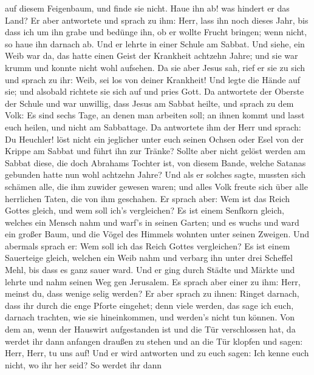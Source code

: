 auf diesem Feigenbaum, und finde sie nicht. Haue ihn ab! was hindert er
das Land?  Er aber antwortete und sprach zu ihm: Herr, lass
ihn noch dieses Jahr, bis dass ich um ihn grabe und bedünge ihn,
 ob er wollte Frucht bringen; wenn nicht, so haue ihn
darnach ab.  Und er lehrte in einer Schule am Sabbat.
 Und siehe, ein Weib war da, das hatte einen Geist der
Krankheit achtzehn Jahre; und sie war krumm und konnte nicht wohl
aufsehen.  Da sie aber Jesus sah, rief er sie zu sich und
sprach zu ihr: Weib, sei los von deiner Krankheit!  Und
legte die Hände auf sie; und alsobald richtete sie sich auf und pries
Gott.  Da antwortete der Oberste der Schule und war
unwillig, dass Jesus am Sabbat heilte, und sprach zu dem Volk: Es sind
sechs Tage, an denen man arbeiten soll; an ihnen kommt und lasst euch
heilen, und nicht am Sabbattage.  Da antwortete ihm der
Herr und sprach: Du Heuchler! löst nicht ein jeglicher unter euch seinen
Ochsen oder Esel von der Krippe am Sabbat und führt ihn zur Tränke?
 Sollte aber nicht gelöst werden am Sabbat diese, die doch
Abrahams Tochter ist, von diesem Bande, welche Satanas gebunden hatte
nun wohl achtzehn Jahre?  Und als er solches sagte, mussten
sich schämen alle, die ihm zuwider gewesen waren; und alles Volk freute
sich über alle herrlichen Taten, die von ihm geschahen.  Er
sprach aber: Wem ist das Reich Gottes gleich, und wem soll ich's
vergleichen?  Es ist einem Senfkorn gleich, welches ein
Mensch nahm und warf's in seinen Garten; und es wuchs und ward ein
großer Baum, und die Vögel des Himmels wohnten unter seinen Zweigen.
 Und abermals sprach er: Wem soll ich das Reich Gottes
vergleichen?  Es ist einem Sauerteige gleich, welchen ein
Weib nahm und verbarg ihn unter drei Scheffel Mehl, bis dass es ganz
sauer ward.  Und er ging durch Städte und Märkte und lehrte
und nahm seinen Weg gen Jerusalem.  Es sprach aber einer zu
ihm: Herr, meinst du, dass wenige selig werden? Er aber sprach zu ihnen:
 Ringet darnach, dass ihr durch die enge Pforte eingehet;
denn viele werden, das sage ich euch, darnach trachten, wie sie
hineinkommen, und werden's nicht tun können.  Von dem an,
wenn der Hauswirt aufgestanden ist und die Tür verschlossen hat, da
werdet ihr dann anfangen draußen zu stehen und an die Tür klopfen und
sagen: Herr, Herr, tu uns auf! Und er wird antworten und zu euch sagen:
Ich kenne euch nicht, wo ihr her seid?  So werdet ihr dann
